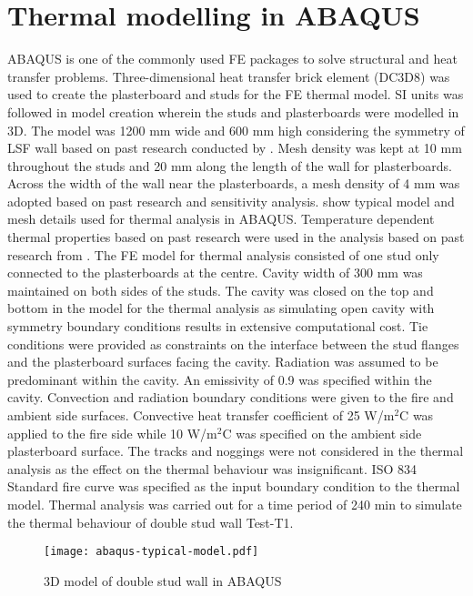 \section{Thermal modelling in ABAQUS}

ABAQUS is one of the commonly used FE packages to solve structural and heat transfer problems. Three-dimensional heat transfer brick element (DC3D8) was used to create the plasterboard and studs for the FE thermal model. SI units was followed in model creation wherein the studs and plasterboards were modelled in 3D. The model was 1200 mm wide and 600 mm high considering the symmetry of LSF wall based on past research conducted by \citet{Rusthi2017,Ariyanayagam2019}. Mesh density was kept at 10 mm throughout the studs and 20 mm along the length of the wall for plasterboards. Across the width of the wall near the plasterboards, a mesh density of 4 mm was adopted based on past research and sensitivity analysis.  show typical model and mesh details used for thermal analysis in ABAQUS. Temperature dependent thermal properties based on past research were used in the analysis based on past research from \citet{Maneesha2018}. The FE model for thermal analysis consisted of one stud only connected to the plasterboards at the centre. Cavity width of 300 mm was maintained on both sides of the studs. The cavity was closed on the top and bottom in the model for the thermal analysis as simulating open cavity with symmetry boundary conditions results in extensive computational cost. Tie conditions were provided as constraints on the interface between the stud flanges and the plasterboard surfaces facing the cavity. Radiation was assumed to be predominant within the cavity. An emissivity of 0.9 was specified within the cavity. Convection and radiation boundary conditions were given to the fire and ambient side surfaces. Convective heat transfer coefficient of 25 W/m$^2$\degree C was applied to the fire side while 10 W/m$^2$\degree C was specified on the ambient side plasterboard surface. The tracks and noggings were not considered in the thermal analysis as the effect on the thermal behaviour was insignificant. ISO 834 Standard fire curve was specified as the input boundary condition to the thermal model. Thermal analysis was carried out for a time period of 240 min to simulate the thermal behaviour of double stud wall Test-T1.
\begin{figure}[!htbp]
	\centering
		\texttt{[image: abaqus-typical-model.pdf]}
		\caption{3D model of double stud wall in ABAQUS}
		\label{fig:abaqus-typical-model}
\end{figure}
